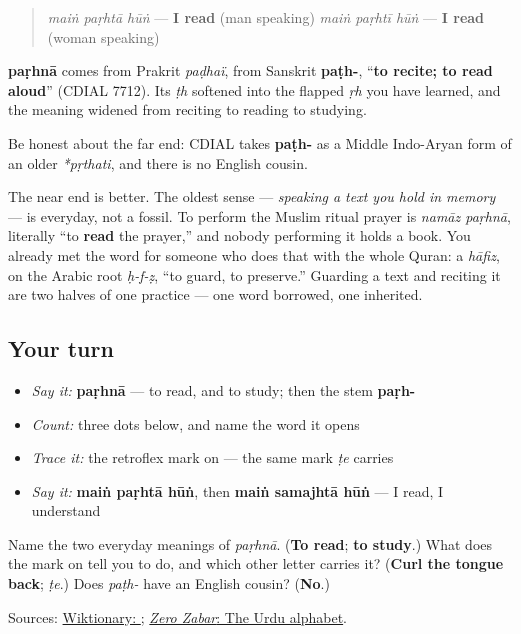 \begin{grammarlens}[title={Grammar Lens: into the frame}]
\begin{quote}
\emph{maiṅ paṛhtā hūṅ} — \textbf{I read} (man speaking) \emph{maiṅ paṛhtī hūṅ} — \textbf{I read} (woman speaking)
\end{quote}
\end{grammarlens}

\begin{cousinweb}
\textbf{paṛhnā} comes from Prakrit \emph{paḍhaï}, from Sanskrit \textbf{paṭh-}, “\textbf{to recite; to read aloud}” (CDIAL 7712). Its \emph{ṭh} softened into the flapped \emph{ṛh} you have learned, and the meaning widened from reciting to reading to studying.

Be honest about the far end: CDIAL takes \textbf{paṭh-} as a Middle Indo-Aryan form of an older \emph{*pṛthati}, and there is no English cousin.

The near end is better. The oldest sense — \emph{speaking a text you hold in memory} — is everyday, not a fossil. To perform the Muslim ritual prayer is \emph{namāz paṛhnā}, literally “to \textbf{read} the prayer,” and nobody performing it holds a book. You already met the word for someone who does that with the whole Quran: a \emph{hāfiz}, on the Arabic root \emph{ḥ-f-ẓ}, “to guard, to preserve.” Guarding a text and reciting it are two halves of one practice — one word borrowed, one inherited.
\end{cousinweb}

\subsection*{Your turn}
\begin{itemize}
\raggedright
  \item \emph{Say it:} \textbf{paṛhnā} — to read, and to study; then the stem \textbf{paṛh-}
  \item \emph{Count:} \textbf{} three dots below, and name the word it opens
  \item \emph{Trace it:} the retroflex mark on \textbf{} — the same mark \emph{ṭe} carries
  \item \emph{Say it:} \textbf{maiṅ paṛhtā hūṅ}, then \textbf{maiṅ samajhtā hūṅ} — I read, I understand
\end{itemize}

\begin{tcolorbox}[breakable,colback=teal!4,colframe=teal!35!black,title={Before you move on}]
Name the two everyday meanings of \emph{paṛhnā}. (\textbf{To read}; \textbf{to study}.) What does the mark on \textbf{} tell you to do, and which other letter carries it? (\textbf{Curl the tongue back}; \emph{ṭe}.) Does \emph{paṭh-} have an English cousin? (\textbf{No}.)

Sources: \href{https://en.wiktionary.org/wiki/\%D9\%BE\%DA\%91\%DA\%BE\%D9\%86\%D8\%A7}{Wiktionary: }; \href{https://openbooks.library.northwestern.edu/zerozabar/chapter/the-urdu-alphabet/}{\emph{Zero Zabar}: The Urdu alphabet}.
\end{tcolorbox}
